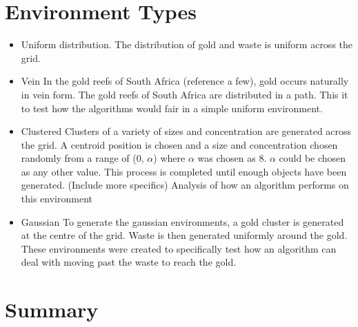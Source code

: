 
\section{Environment Types}
\label{thri:third:environmenttypes}
	\begin{itemize}
		\item Uniform distribution. 
			The distribution of gold and waste is uniform across the grid. 
		\item Vein
			In the gold reefs of South Africa (reference a few), gold occurs naturally in vein form. The gold reefs of South Africa are distributed in a path. This it to test how the algorithms would fair in a simple uniform environment.
		\item Clustered
			Clusters of a variety of sizes and concentration are generated across the grid. A centroid position is chosen and a size and concentration chosen randomly from a range of (0, $\alpha$) where $\alpha$ was chosen as 8. $\alpha$ could be chosen as any other value. This process is completed until enough objects have been generated. (Include more specifics) Analysis of how an algorithm performs on this environment 
		\item Gaussian
			To generate the gaussian environments, a gold cluster is generated at the centre of the grid. Waste is then generated uniformly around the gold. These environments were created to specifically test how an algorithm can deal with moving past the waste to reach the gold. 
	\end{itemize}


\section{Summary}
\label{fourth:summary}

